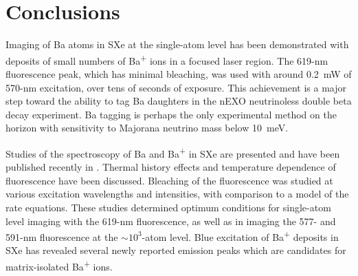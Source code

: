 \chapter{Conclusions}

Imaging of Ba atoms in SXe at the single-atom level has been demonstrated with deposits of small numbers of Ba\textsuperscript{+} ions in a focused laser region.  The 619-nm fluorescence peak, which has minimal bleaching, was used with around 0.2~mW of 570-nm excitation, over tens of seconds of exposure.  This achievement is a major step toward the ability to tag Ba daughters in the nEXO neutrinoless double beta decay experiment.  Ba tagging is perhaps the only experimental method on the horizon with sensitivity to Majorana neutrino mass below 10~meV.

Studies of the spectroscopy of Ba and Ba\textsuperscript{+} in SXe are presented and have been published recently in \cite{Mong2015}.  Thermal history effects and temperature dependence of fluorescence have been discussed.  Bleaching of the fluorescence was studied at various excitation wavelengths and intensities, with comparison to a model of the rate equations.  These studies determined optimum conditions for single-atom level imaging with the 619-nm fluorescence, as well as in imaging the 577- and 591-nm fluorescence at the $\sim 10^{3}$-atom level.  Blue excitation of Ba\textsuperscript{+} deposits in SXe has revealed several newly reported emission peaks which are candidates for matrix-isolated Ba\textsuperscript{+} ions.



